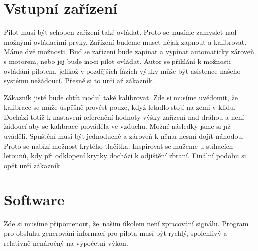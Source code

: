 	\section{Vstupní zařízení}		
		Pilot musí být schopen zařízení také ovládat. Proto se musíme zamyslet nad možnými ovládacími prvky.
		Zařízení budeme muset nějak zapnout a kalibrovat. Máme dvě možnosti. Buď se zařízení bude zapínat a vypínat automaticky zároveň s motorem, nebo jej bude moci pilot ovládat. Autor se přiklání k možnosti ovládání pilotem, jelikož v pozdějších fázích výuky může být asistence našeho systému nežádoucí. Přesně si to určí až zákazník.\par
		Zákazník jistě bude chtít modul také kalibrovat. Zde si musíme uvědomit, že kalibrace se může úspěšně provést pouze, když letadlo stojí na zemi v klidu. Dochází totiž k nastavení referenční hodnoty výšky zařízení nad dráhou a není žádoucí aby se kalibrace prováděla ve vzduchu. Možné následky jsme si již uváděli. Spuštění musí být jednoduché a zároveň k němu nesmí dojít náhodou. Proto se nabízí možnost krytého tlačítka. Inspirovat se můžeme u stíhacích letounů, kdy při odklopení krytky dochází k odjištění zbraní. Finální podobu si opět určí zákazník.
	
	\section{Software}\label{navrhReseni::software}
		Zde si musíme připomenout, že~našim úkolem není zpracování signálu. Program pro obsluhu generování informací pro pilota musí být rychlý, spolehlivý a relativně nenáročný na výpočetní výkon.
		
